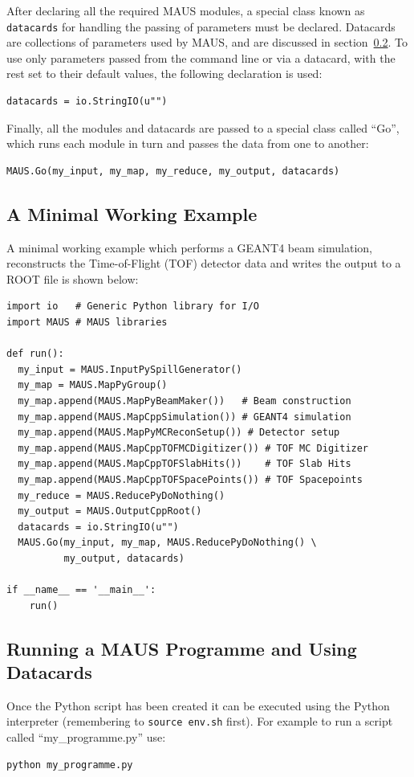 \documentclass[a4paper,10pt]{article}
\begin{document}
    After declaring all the required MAUS modules, a special class known as \texttt{datacards} for handling the passing of parameters must be declared. Datacards are collections of parameters used by MAUS, and are discussed in section~\ref{sec:RunningAProgramme}. To use only parameters passed from the command line or via a datacard, with the rest set to their default values, the following declaration is used:
    \begin{lstlisting}
datacards = io.StringIO(u"")
    \end{lstlisting}

    Finally, all the modules and datacards are passed to a special class called ``Go'', which runs each module in turn and passes the data from one to another:
    \begin{lstlisting}
MAUS.Go(my_input, my_map, my_reduce, my_output, datacards)
    \end{lstlisting}

  \subsection{A Minimal Working Example}
    A minimal working example which performs a GEANT4 beam simulation, reconstructs the Time-of-Flight (TOF) detector data and writes the output to a ROOT file is shown below:
    \begin{lstlisting}
import io   # Generic Python library for I/O
import MAUS # MAUS libraries

def run():
  my_input = MAUS.InputPySpillGenerator()
  my_map = MAUS.MapPyGroup()
  my_map.append(MAUS.MapPyBeamMaker())   # Beam construction
  my_map.append(MAUS.MapCppSimulation()) # GEANT4 simulation
  my_map.append(MAUS.MapPyMCReconSetup()) # Detector setup
  my_map.append(MAUS.MapCppTOFMCDigitizer()) # TOF MC Digitizer
  my_map.append(MAUS.MapCppTOFSlabHits())    # TOF Slab Hits
  my_map.append(MAUS.MapCppTOFSpacePoints()) # TOF Spacepoints
  my_reduce = MAUS.ReducePyDoNothing()
  my_output = MAUS.OutputCppRoot()
  datacards = io.StringIO(u"")
  MAUS.Go(my_input, my_map, MAUS.ReducePyDoNothing() \
          my_output, datacards)

if __name__ == '__main__':
    run() 
    \end{lstlisting}

\lstset{style=custombash}

  \subsection{Running a MAUS Programme and Using Datacards}
  \label{sec:RunningAProgramme}
    Once the Python script has been created it can be executed using the Python interpreter (remembering to \texttt{source env.sh} first). For example to run a script called ``my\_programme.py'' use:
   \begin{lstlisting}
python my_programme.py
    \end{lstlisting}
    
\end{document}

